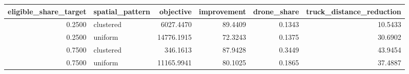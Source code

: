 \begin{tabular}{rlrrrr}
\toprule
eligible_share_target & spatial_pattern & objective & improvement & drone_share & truck_distance_reduction \\
\midrule
0.2500 & clustered & 6027.4470 & 89.4409 & 0.1343 & 10.5433 \\
0.2500 & uniform & 14776.1915 & 72.3243 & 0.1375 & 30.6902 \\
0.7500 & clustered & 346.1613 & 87.9428 & 0.3449 & 43.9454 \\
0.7500 & uniform & 11165.9941 & 80.1025 & 0.1865 & 37.4887 \\
\bottomrule
\end{tabular}
